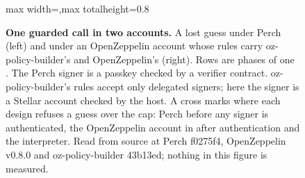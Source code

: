 \begin{figure}[tbp]
\centering
\begin{adjustbox}{max width=\linewidth,max totalheight=0.8\textheight}%
%
\end{adjustbox}
\caption{\textbf{One guarded call in two accounts.} A lost guess under Perch (left) and under an OpenZeppelin account whose rules carry oz-policy-builder's  and OpenZeppelin's  (right). Rows are phases of one . The Perch signer is a passkey checked by a verifier contract. oz-policy-builder's rules accept only delegated signers; here the signer is a Stellar account checked by the host. A cross marks where each design refuses a guess over the cap: Perch before any signer is authenticated, the OpenZeppelin account in  after authentication and the interpreter. Read from source at Perch f0275f4, OpenZeppelin  v0.8.0 and oz-policy-builder 43b13ed; nothing in this figure is measured.}\label{fig:fig-two-paths}
\end{figure}
